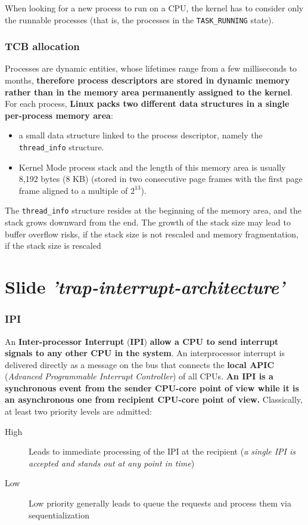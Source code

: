 \documentclass[10pt,a4paper]{article}
\begin{document}
When looking for a new process to run on a CPU, the kernel has to consider only the runnable processes (that is, the processes in the \texttt{TASK\_RUNNING} state).

\subsubsection{TCB allocation}

Processes are dynamic entities, whose lifetimes range from a few milliseconds to months, \textbf{therefore process descriptors are stored in dynamic memory rather than in the memory area permanently assigned to the kernel}. For each process, \textbf{Linux packs two different data structures in a single per-process memory area}:
\begin{itemize}
\item a small data structure linked to the process descriptor, namely the \texttt{thread\_info} structure.
\item Kernel Mode process stack and the length of this memory area is usually 8,192 bytes (8 KB) (stored in two consecutive page frames with the first page frame aligned to a multiple of $2^13$).
\end{itemize}

The \texttt{thread\_info} structure resides at the beginning of the memory area, and the stack grows downward from the end. The growth of the stack size may lead to buffer overflow risks, if the stack size is not rescaled and memory fragmentation, if the stack size is rescaled


\newpage
\section{Slide \textit{'trap-interrupt-architecture'}}

\subsubsection{IPI}

An \textbf{Inter-processor Interrupt} (\textbf{IPI}) \textbf{allow a CPU to send interrupt signals to any other CPU in the system}. An interprocessor interrupt is delivered directly as a message on the bus that connects the \textbf{local APIC} (\textit{Advanced Programmable Interrupt Controller}) of all CPUs. \textbf{An IPI is a synchronous event from the sender CPU-core point of view while it is an asynchronous one from recipient CPU-core point of view.}
Classically, at least two priority levels are admitted:
\begin{description}
\item[High] Leads to immediate processing of the IPI at the recipient (\textit{a single IPI is accepted and stands out at any point in time})
\item[Low] Low priority generally leads to queue the requests and process them via sequentialization
\end{description}
\end{document}
